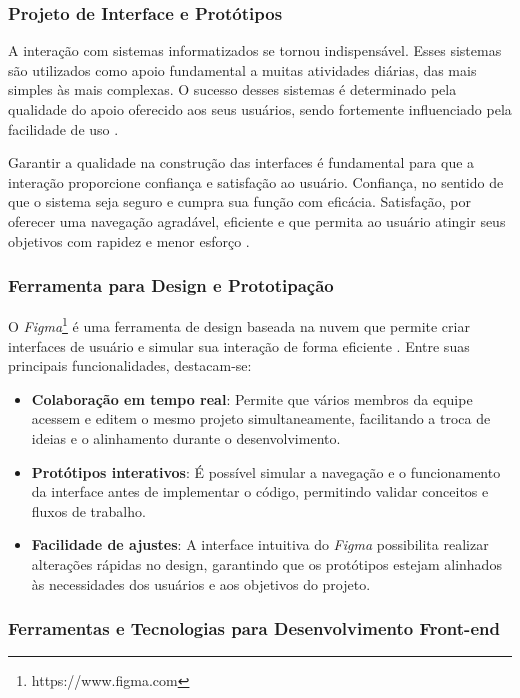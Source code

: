 \subsubsection{Projeto de Interface e Protótipos}

A interação com sistemas informatizados se tornou indispensável. Esses sistemas são utilizados como apoio fundamental a muitas atividades diárias, das mais simples às mais complexas. O sucesso desses sistemas é determinado pela qualidade do apoio oferecido aos seus usuários, sendo fortemente influenciado pela facilidade de uso \cite{miletto2014desenvolvimento}.

Garantir a qualidade na construção das interfaces é fundamental para que a interação proporcione confiança e satisfação ao usuário. Confiança, no sentido de que o sistema seja seguro e cumpra sua função com eficácia. Satisfação, por oferecer uma navegação agradável, eficiente e que permita ao usuário atingir seus objetivos com rapidez e menor esforço \cite{miletto2014desenvolvimento}.

\subsubsection{Ferramenta para Design e Prototipação}

O \textit{Figma}\footnote{https://www.figma.com} é uma ferramenta de design baseada na nuvem que permite criar interfaces de usuário e simular sua interação de forma eficiente \cite{Figma2025}. Entre suas principais funcionalidades, destacam-se:

\begin{itemize}
    \item \textbf{Colaboração em tempo real}: Permite que vários membros da equipe acessem e editem o mesmo projeto simultaneamente, facilitando a troca de ideias e o alinhamento durante o desenvolvimento.
    \item \textbf{Protótipos interativos}: É possível simular a navegação e o funcionamento da interface antes de implementar o código, permitindo validar conceitos e fluxos de trabalho.
    \item \textbf{Facilidade de ajustes}: A interface intuitiva do \textit{Figma} possibilita realizar alterações rápidas no design, garantindo que os protótipos estejam alinhados às necessidades dos usuários e aos objetivos do projeto.
\end{itemize}

\subsubsection{Ferramentas e Tecnologias para Desenvolvimento Front-end}

